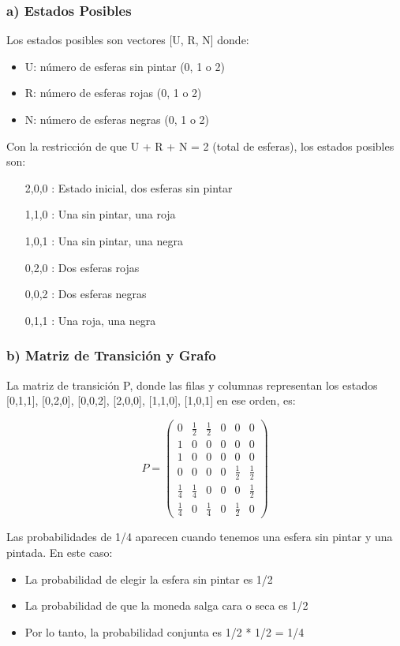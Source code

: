 \documentclass[12pt]{article}
\begin{document}
\subsubsection{a) Estados Posibles}

Los estados posibles son vectores [U, R, N] donde:
\begin{itemize}
    \item U: número de esferas sin pintar (0, 1 o 2)
    \item R: número de esferas rojas (0, 1 o 2)
    \item N: número de esferas negras (0, 1 o 2)
\end{itemize}

Con la restricción de que U + R + N = 2 (total de esferas), los estados posibles son:
\begin{itemize}
    \item [2,0,0]: Estado inicial, dos esferas sin pintar
    \item [1,1,0]: Una sin pintar, una roja
    \item [1,0,1]: Una sin pintar, una negra
    \item [0,2,0]: Dos esferas rojas
    \item [0,0,2]: Dos esferas negras
    \item [0,1,1]: Una roja, una negra
\end{itemize}

\subsubsection{b) Matriz de Transición y Grafo}

La matriz de transición P, donde las filas y columnas representan los estados [0,1,1], [0,2,0], [0,0,2], [2,0,0], [1,1,0], [1,0,1] en ese orden, es:

\[
P = \begin{pmatrix}
0 & \frac{1}{2} & \frac{1}{2} & 0 & 0 & 0 \\
1 & 0 & 0 & 0 & 0 & 0 \\
1 & 0 & 0 & 0 & 0 & 0 \\
0 & 0 & 0 & 0 & \frac{1}{2} & \frac{1}{2} \\
\frac{1}{4} & \frac{1}{4} & 0 & 0 & 0 & \frac{1}{2} \\
\frac{1}{4} & 0 & \frac{1}{4} & 0 & \frac{1}{2} & 0
\end{pmatrix}
\]

Las probabilidades de 1/4 aparecen cuando tenemos una esfera sin pintar y una pintada. En este caso:
\begin{itemize}
    \item La probabilidad de elegir la esfera sin pintar es 1/2
    \item La probabilidad de que la moneda salga cara o seca es 1/2
    \item Por lo tanto, la probabilidad conjunta es 1/2 * 1/2 = 1/4
\end{itemize}
\end{document}
